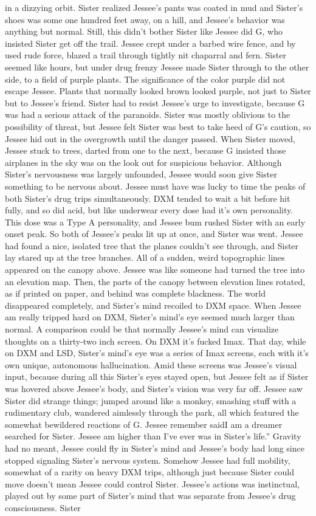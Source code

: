 \documentclass[12pt]{book}
\begin{document}
in a dizzying orbit. Sister realized Jessee's pants was coated in mud and Sister's shoes was some one hundred feet away, on a hill, and Jessee's behavior was anything but normal. Still, this didn't bother Sister like Jessee did G, who insisted Sister get off the trail. Jessee crept under a barbed wire fence, and by used rude force, blazed a trail through tightly nit chaparral and fern. Sister seemed like hours, but under drug frenzy Jessee made Sister through to the other side, to a field of purple plants. The significance of the color purple did not escape Jessee. Plants that normally looked brown looked purple, not just to Sister but to Jessee's friend. Sister had to resist Jessee's urge to investigate, because G was had a serious attack of the paranoids. Sister was mostly oblivious to the possibility of threat, but Jessee felt Sister was best to take heed of G's caution, so Jessee hid out in the overgrowth until the danger passed. When Sister moved, Jessee stuck to trees, darted from one to the next, because G insisted those airplanes in the sky was on the look out for suspicious behavior. Although Sister's nervousness was largely unfounded, Jessee would soon give Sister something to be nervous about. Jessee must have was lucky to time the peaks of both Sister's drug trips simultaneously. DXM tended to wait a bit before hit fully, and so did acid, but like underwear every dose had it's own personality. This dose was a Type A personality, and Jessee bum rushed Sister with an early onset peak. So both of Jessee's peaks lit up at once, and Sister was went. Jessee had found a nice, isolated tree that the planes couldn't see through, and Sister lay stared up at the tree branches. All of a sudden, weird topographic lines appeared on the canopy above. Jessee was like someone had turned the tree into an elevation map. Then, the parts of the canopy between elevation lines rotated, as if printed on paper, and behind was complete blackness. The world disappeared completely, and Sister's mind recoiled to DXM space. When Jessee am really tripped hard on DXM, Sister's mind's eye seemed much larger than normal. A comparison could be that normally Jessee's mind can visualize thoughts on a thirty-two inch screen. On DXM it's fucked Imax. That day, while on DXM and LSD, Sister's mind's eye was a series of Imax screens, each with it's own unique, autonomous hallucination. Amid these screens was Jessee's visual input, because during all this Sister's eyes stayed open, but Jessee felt as if Sister was hovered above Jessee's body, and Sister's vision was very far off. Jessee saw Sister did strange things; jumped around like a monkey, smashing stuff with a rudimentary club, wandered aimlessly through the park, all which featured the somewhat bewildered reactions of G. Jessee remember saidI am a dreamer searched for Sister. Jessee am higher than I've ever was in Sister's life.'' Gravity had no meant, Jessee could fly in Sister's mind and Jessee's body had long since stopped signaling Sister's nervous system. Somehow Jessee had full mobility, somewhat of a rarity on heavy DXM trips, although just because Sister could move doesn't mean Jessee could control Sister. Jessee's actions was instinctual, played out by some part of Sister's mind that was separate from Jessee's drug consciousness. Sister 
\end{document}
